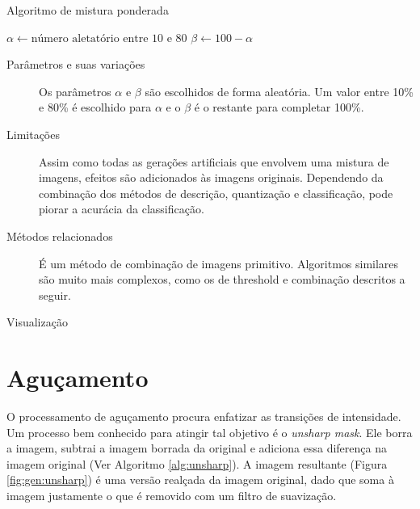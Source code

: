 \vspace{0.5cm}
\begin{algorithm}[H]
  \caption{Algoritmo de mistura ponderada}
  \label{alg:blend}
  \SetAlgoLined


  {$\alpha \gets \text{número aletatório entre 10 e 80}$\;}
  {$\beta \gets 100 - \alpha$\;}

  \end{algorithm}
\vspace{0.5cm}

\begin{description}
\item[Parâmetros e suas variações]
Os parâmetros $\alpha$ e $\beta$ são escolhidos de forma aleatória. Um valor entre
10\% e 80\% é escolhido para $\alpha$ e o $\beta$ é o restante para completar 100\%.

\item[Limitações]
Assim como todas as gerações artificiais que envolvem uma mistura de imagens,
efeitos são adicionados às imagens originais. Dependendo da combinação dos métodos
de descrição, quantização e classificação, pode piorar a acurácia da classificação.

\item[Métodos relacionados]
É um método de combinação de imagens primitivo. Algoritmos similares são muito mais
complexos, como os de threshold e combinação descritos a seguir.

\item[Visualização]

\end{description}
\section{Aguçamento}

O processamento de aguçamento procura enfatizar as transições de intensidade.
Um processo bem conhecido para atingir tal objetivo é o \textit{unsharp mask}.
Ele borra a imagem, subtrai a imagem borrada da original e adiciona essa diferença
na imagem original (Ver Algoritmo \ref{alg:unsharp}). A imagem resultante
(Figura \ref{fig:gen:unsharp}) é uma versão realçada da imagem original,
dado que soma à imagem justamente o que é removido com um filtro de suavização.

